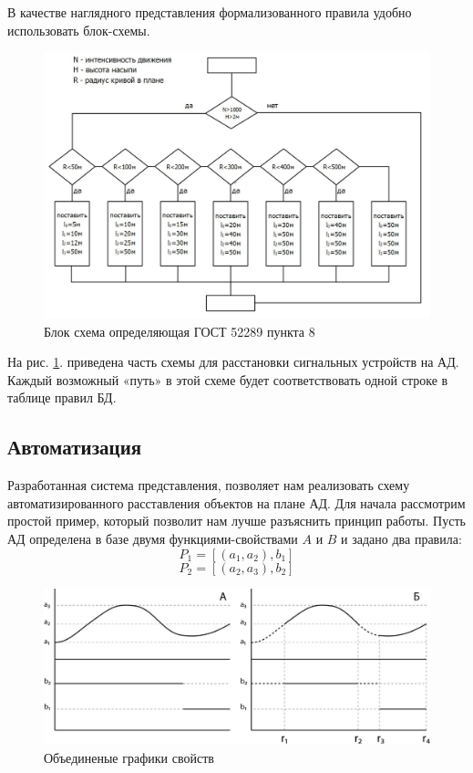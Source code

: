 В качестве наглядного представления формализованного правила удобно использовать блок-схемы. 

\begin{figure}[h]
	\centering
	\includegraphics[scale=1]{images/auto_scheme_2}
	\caption{Блок схема определяющая ГОСТ 52289 пункта 8}
	\label{auto_scheme_2}
\end{figure}

На рис. \ref{auto_scheme_2}. приведена часть схемы для расстановки сигнальных устройств на АД. Каждый возможный «путь» в этой схеме будет соответствовать одной строке в таблице правил БД. 

\subsection{Автоматизация}
Разработанная система представления, позволяет нам реализовать схему автоматизированного расставления объектов на плане АД. Для начала рассмотрим простой пример, который позволит нам лучше разъяснить принцип работы. Пусть АД определена в базе двумя функциями-свойствами $A$ и $B$ и задано два правила:
$$
P_1 = [(a_1, a_2), b_1]
$$
$$
P_2 = [(a_2, a_3), b_2]
$$
\begin{figure}[h]
	\centering
	\includegraphics[scale=1]{images/auto_grap3}
	\caption{Объединеные графики свойств}
	\label{auto_graph3}
\end{figure}


